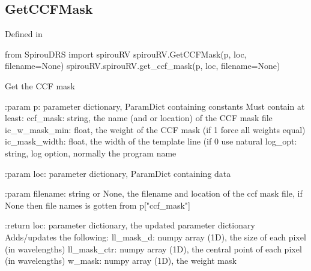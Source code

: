 \noindent\begin{minipage}{\textwidth}
\subsection{GetCCFMask}

Defined in \spirouRV{}

\begin{pythonbox}
from SpirouDRS import spirouRV
spirouRV.GetCCFMask(p, loc, filename=None)
spirouRV.spirouRV.get_ccf_mask(p, loc, filename=None)
\end{pythonbox}

\begin{pythondocstring}
Get the CCF mask

:param p: parameter dictionary, ParamDict containing constants
    Must contain at least:
            ccf_mask: string, the name (and or location) of the CCF
                      mask file
            ic_w_mask_min: float, the weight of the CCF mask (if 1 force
                           all weights equal)
            ic_mask_width: float, the width of the template line
                           (if 0 use natural
            log_opt: string, log option, normally the program name

:param loc: parameter dictionary, ParamDict containing data

:param filename: string or None, the filename and location of the ccf mask
                 file, if None then file names is gotten from p["ccf_mask"]

:return loc: parameter dictionary, the updated parameter dictionary
        Adds/updates the following:
            ll_mask_d: numpy array (1D), the size of each pixel
                       (in wavelengths)
            ll_mask_ctr: numpy array (1D), the central point of each pixel
                         (in wavelengths)
            w_mask: numpy array (1D), the weight mask
\end{pythondocstring}
\end{minipage}

